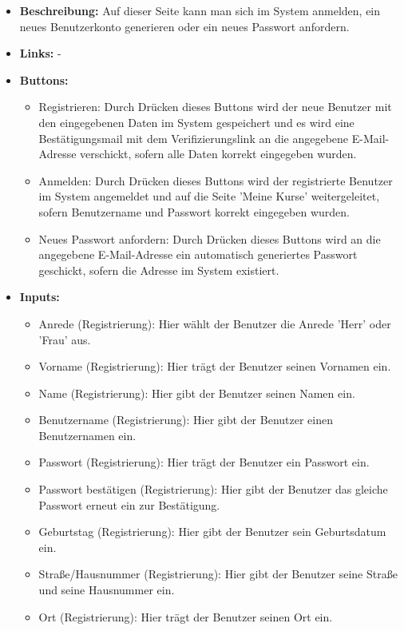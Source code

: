 				\begin{itemize}
					\item \textbf{Beschreibung:}
					Auf dieser Seite kann man sich im System anmelden, ein neues Benutzerkonto generieren oder ein neues Passwort anfordern.
					\item \textbf{Links:} -
					\item \textbf{Buttons:}
						\begin{itemize}
							\item Registrieren: Durch Drücken dieses Buttons wird der neue Benutzer mit den eingegebenen Daten im System gespeichert und es wird eine Bestätigungsmail mit dem Verifizierungslink an die angegebene E-Mail-Adresse verschickt, sofern alle Daten korrekt eingegeben wurden.
							\item Anmelden: Durch Drücken dieses Buttons wird der registrierte Benutzer im System angemeldet und auf die Seite 'Meine Kurse' weitergeleitet, sofern Benutzername und Passwort korrekt eingegeben wurden.
							\item Neues Passwort anfordern: Durch Drücken dieses Buttons wird an die angegebene E-Mail-Adresse ein automatisch generiertes Passwort geschickt, sofern die Adresse im System existiert.
						\end{itemize}
					\item \textbf{Inputs:}
						\begin{itemize}
							\item Anrede (Registrierung): Hier wählt der Benutzer die Anrede 'Herr' oder 'Frau' aus.
							\item Vorname (Registrierung): Hier trägt der Benutzer seinen Vornamen ein.
							\item Name (Registrierung): Hier gibt der Benutzer seinen Namen ein.
							\item Benutzername (Registrierung): Hier gibt der Benutzer einen Benutzernamen ein.
							\item Passwort (Registrierung): Hier trägt der Benutzer ein Passwort ein.
							\item Passwort bestätigen (Registrierung): Hier gibt der Benutzer das gleiche Passwort erneut ein zur Bestätigung.
							\item Geburtstag (Registrierung): Hier gibt der Benutzer sein Geburtsdatum ein.
							\item Straße/Hausnummer (Registrierung): Hier gibt der Benutzer seine Straße und seine Hausnummer ein.
							\item Ort (Registrierung): Hier trägt der Benutzer seinen Ort ein.

\end{itemize}
\end{itemize}
